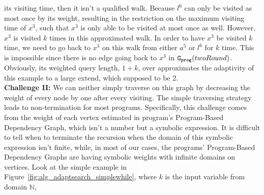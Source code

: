 its visiting time,
then it isn't a qualified walk. 
Because $l^6$ can only be visited as most once by its weight,
resulting in the restriction on the maximum visiting time of $x^3$,
such that $x^3$ is only able to be visited at most once as well.
%
However, $x^3$ is visited $k$ times in this approximated walk.
In order to have $x^3$ be visited $k$ time, we need to go back to 
$x^3$ on this walk from either $a^5$ or $l^6$ for $k$ time.
This is impossible since there is no edge going back to $x^3$ in $\mathtt{{G_{prog}}}(twoRound)$.
Obviously,
its weighted query length, $1 + k$, 
over approximates 
the adaptivity of this example to a large extend, which supposed to be $2$. 
\\
\textbf{Challenge II:}
We can neither simply traverse on this graph by decreasing the weight of every node by one after every visiting. 
The simple 
traversing strategy leads to non-termination for most programs. 
Specifically, this challenge comes from the weight of each vertex estimated in program's Program-Based Dependency Graph,
which isn't a number but a symbolic expression. 
It is difficult to tell when to terminate the recursion when the domain of this symbolic expression isn't finite,
while, in most of our cases, the programs' Program-Based Dependency Graphs are having symbolic weights with infinite domains on vertices.
Look at the simple example in Figure~\ref{fig:alg_adaptsearch_simplewhile}, where $k$ is the input variable from domain $\mathbb{N}$,
